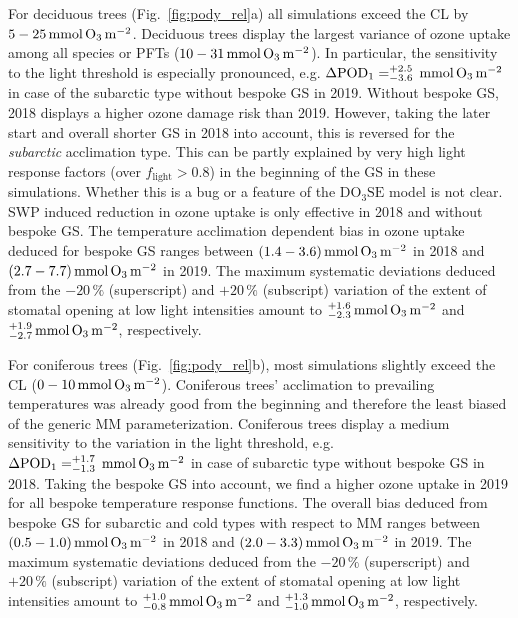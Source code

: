 \documentclass[bg, manuscript]{copernicus}
\begin{document}
For deciduous trees (Fig.~\ref{fig:pody_rel}a) all simulations exceed the CL by $5-25\,\unit{mmol\,\chem{O_3}\,m^{-2}}$. Deciduous trees display the largest variance of ozone uptake among all species or PFTs ($10-31\,\unit{mmol\,\chem{O_3}\,m^{-2}}$). In particular, the sensitivity to the light threshold is especially pronounced, e.g. $\Delta\mathrm{POD_1} = ^{+2.5}_{-3.6}\,\unit{mmol\,\chem{O_3}\,m^{-2}}$ in case of the subarctic type without bespoke GS in 2019. Without bespoke GS, 2018 displays a higher ozone damage risk than 2019. However, taking the later start and overall shorter GS in 2018 into account, this is reversed for the \emph{subarctic} acclimation type. This can be partly explained by very high light response factors (over $f_\mathrm{light}>0.8$) in the beginning of the GS in these simulations. Whether this is a bug or a feature of the $\mathrm{DO_3SE}$ model is not clear. SWP induced reduction in ozone uptake is only effective in 2018 and without bespoke GS. The temperature acclimation dependent bias in ozone uptake deduced for bespoke GS ranges between $(1.4-3.6)\,\unit{mmol\,\chem{O_3}\,m^{-2}}$ in 2018 and $(2.7-7.7)\,\unit{mmol\,\chem{O_3}\,m^{-2}}$ in 2019. The maximum systematic deviations deduced from the $-20\,\unit{\%}$ (superscript) and $+20\,\unit{\%}$ (subscript) variation of the extent of stomatal opening at low light intensities amount to $^{+1.6}_{-2.3}\,\unit{mmol\,\chem{O_3}\,m^{-2}}$ and $^{+1.9}_{-2.7}\,\unit{mmol\,\chem{O_3}\,m^{-2}}$, respectively. 

For coniferous trees (Fig.~\ref{fig:pody_rel}b), most simulations slightly exceed the CL ($0-10\,\unit{mmol\,\chem{O_3}\,m^{-2}}$). Coniferous trees' acclimation to prevailing temperatures was already good from the beginning and therefore the least biased of the generic MM parameterization. Coniferous trees display a medium sensitivity to the variation in the light threshold, e.g. $\Delta\mathrm{POD_1} = ^{+1.7}_{-1.3}\,\unit{mmol\,\chem{O_3}\,m^{-2}}$ in case of subarctic type without bespoke GS in 2018. Taking the bespoke GS into account, we find a higher ozone uptake in 2019 for all bespoke temperature response functions. The overall bias deduced from bespoke GS for subarctic and cold types with respect to MM ranges between $(0.5-1.0)\,\unit{mmol\,\chem{O_3}\,m^{-2}}$ in 2018 and $(2.0-3.3)\,\unit{mmol\,\chem{O_3}\,m^{-2}}$ in 2019. The maximum systematic deviations deduced from the $-20\,\unit{\%}$ (superscript) and $+20\,\unit{\%}$ (subscript) variation of the extent of stomatal opening at low light intensities amount to $^{+1.0}_{-0.8}\,\unit{mmol\,\chem{O_3}\,m^{-2}}$ and $^{+1.3}_{-1.0}\,\unit{mmol\,\chem{O_3}\,m^{-2}}$, respectively.
\end{document}
